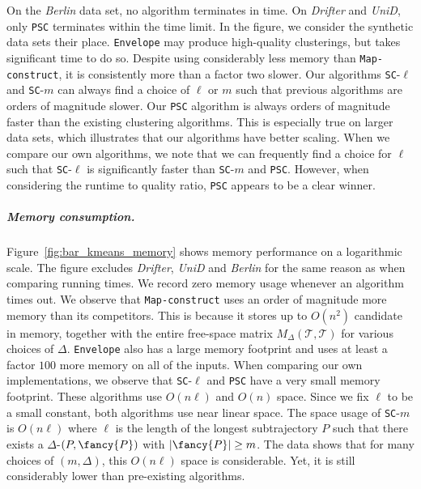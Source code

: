 On the \emph{Berlin} data set, no algorithm terminates in time.
On \emph{Drifter} and \emph{UniD}, only \texttt{PSC} terminates within the time limit. In the figure, we consider the synthetic data sets their place. 
%
%
\texttt{Envelope} may produce high-quality clusterings, but takes significant time to do so. 
Despite using considerably less memory than \texttt{Map-construct}, it is consistently more than a factor two slower.
Our algorithms \texttt{SC}-$\ell$ and \texttt{SC}-$m$ can always find a choice of $\ell$ or $m$ such that previous algorithms are orders of magnitude slower. 
Our \texttt{PSC} algorithm is always orders of magnitude faster than the existing clustering algorithms. 
This is especially true on larger data sets, which illustrates that our algorithms have better scaling. 
%
When we compare our own algorithms, we note that we can frequently find a choice for $\ell$ such that \texttt{SC}-$\ell$ is significantly faster than \texttt{SC}-$m$ and \texttt{PSC}.
However, when considering the runtime  to quality ratio, \texttt{PSC} appears to be a clear winner. 
%
%
\subparagraph{Memory consumption.}
Figure~\ref{fig:bar_kmeans_memory} shows memory performance on a logarithmic scale. The figure excludes \emph{Drifter}, \emph{UniD} and \emph{Berlin} for the same reason as when comparing running times. 
We record zero memory usage whenever an algorithm times out. 
%
%
We observe that \texttt{Map-construct} uses an order of magnitude more memory than its competitors. This is because it stores up to $O(n^2)$ candidate \pathlets
in memory, together with the entire free-space matrix $M_\Delta(\mathcal{T}, \mathcal{T})$ for various choices of $\Delta$. \texttt{Envelope} also has a large memory footprint and uses at least a factor $100$ more memory on all of the inputs. 
%
When comparing our own implementations, we observe that \texttt{SC}-$\ell$ and \texttt{PSC} have a very small memory footprint.
These algorithms use $O(n \ell)$ and $O(n)$ space. Since we fix $\ell$ to be a small constant, both algorithms use near linear space.  
The space usage of \texttt{SC}-$m$ is $O(n \ell)$ where $\ell$ is the length of the longest subtrajectory $P$ such that there exists a $\Delta$-\pathlet $(P, {\fancy{P}})$ with $|{\fancy{P}}| \geq m$. 
The data shows that for many choices of $(m, \Delta)$, this $O(n \ell)$ space is considerable. Yet, it is still considerably lower than pre-existing algorithms.
%
